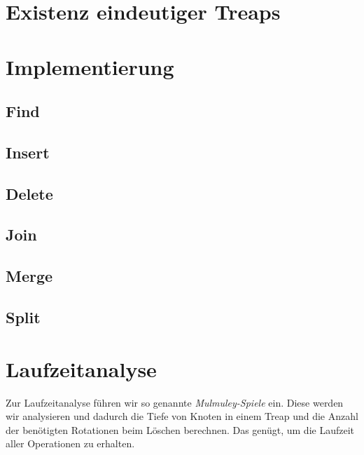 \documentclass[a4paper]{scrreprt}
\theoremstyle{definition}
\begin{document}
\section{Existenz eindeutiger Treaps}
\label{sec:uniquetreaps}

\section{Implementierung}
\label{sec:implementing}

\subsection{Find}
\label{sec:find}

\subsection{Insert}
\label{sec:insert}

\subsection{Delete}
\label{sec:delete}

\subsection{Join}
\label{sec:join}

\subsection{Merge}
\label{sec:merge}

\subsection{Split}
\label{sec:split}

\section{Laufzeitanalyse}
\label{sec:runtime}
Zur Laufzeitanalyse führen wir so genannte \emph{Mulmuley-Spiele} ein.
Diese werden wir analysieren und dadurch die Tiefe von Knoten in einem Treap und die Anzahl der benötigten Rotationen beim Löschen berechnen.
Das genügt, um die Laufzeit aller Operationen zu erhalten.
\end{document}

